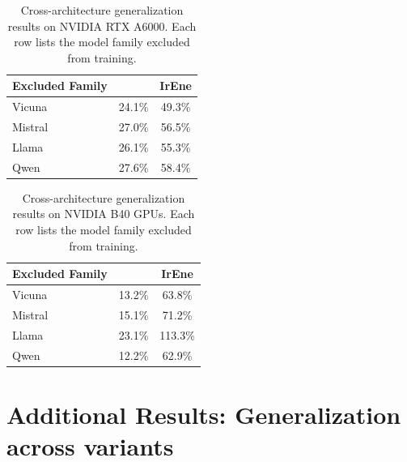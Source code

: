 \begin{table}[t]
\centering
\small
\setlength{\tabcolsep}{4pt}
\renewcommand{\arraystretch}{1.05}
\begin{tabular}{lcc}
\hline
\textbf{Excluded Family} & \textbf{\sys{}} & \textbf{IrEne} \\
\hline
\rowcolor{rowblue}Vicuna  & 24.1\% & 49.3\% \\
Mistral                  & 27.0\% & 56.5\% \\
\rowcolor{rowblue}Llama  & 26.1\% & 55.3\% \\
Qwen                     & 27.6\% & 58.4\% \\
\hline
\end{tabular}
\caption{Cross-architecture generalization results on NVIDIA RTX A6000. Each row lists the model family excluded from training.}
\label{tab:cross_model_generalization}
\end{table}

\begin{table}[t]
\centering
\small
\setlength{\tabcolsep}{4pt}
\renewcommand{\arraystretch}{1.05}
\begin{tabular}{lcc}
\hline
\textbf{Excluded Family} & \textbf{\sys{}} & \textbf{IrEne} \\
\hline
\rowcolor{rowblue}Vicuna  & 13.2\% & 63.8\%  \\
Mistral                  & 15.1\% & 71.2\%  \\
\rowcolor{rowblue}Llama  & 23.1\% & 113.3\% \\
Qwen                     & 12.2\% & 62.9\%  \\
\hline
\end{tabular}
\caption{Cross-architecture generalization results on NVIDIA B40 GPUs. Each row lists the model family excluded from training.}
\label{tab:b40_cross_model_generalization}
\end{table}

\section{Additional Results: Generalization across variants}
\label{app:additional-generalization-unseen-variants}

